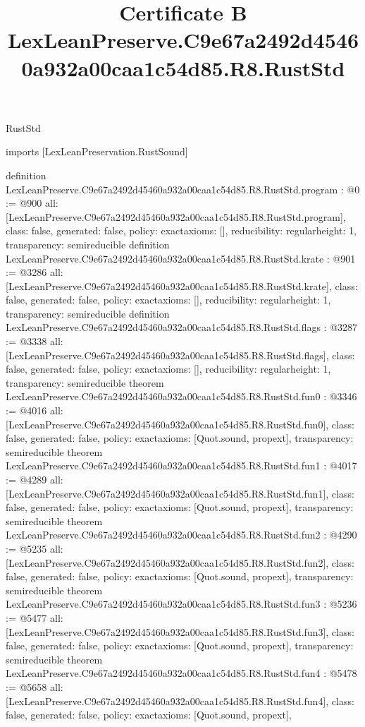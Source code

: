 \begin{lexlean}{RustStd}
\title{Certificate B LexLeanPreserve.C9e67a2492d45460a932a00caa1c54d85.R8.RustStd}
\begin{coremodule}
imports [LexLeanPreservation.RustSound]

definition LexLeanPreserve.C9e67a2492d45460a932a00caa1c54d85.R8.RustStd.program : @0 := @900 {
  all: [LexLeanPreserve.C9e67a2492d45460a932a00caa1c54d85.R8.RustStd.program],
  class: false,
  generated: false,
  policy: exact{axioms: []},
  reducibility: regular{height: 1},
  transparency: semireducible
}
definition LexLeanPreserve.C9e67a2492d45460a932a00caa1c54d85.R8.RustStd.krate : @901 := @3286 {
  all: [LexLeanPreserve.C9e67a2492d45460a932a00caa1c54d85.R8.RustStd.krate],
  class: false,
  generated: false,
  policy: exact{axioms: []},
  reducibility: regular{height: 1},
  transparency: semireducible
}
definition LexLeanPreserve.C9e67a2492d45460a932a00caa1c54d85.R8.RustStd.flags : @3287 := @3338 {
  all: [LexLeanPreserve.C9e67a2492d45460a932a00caa1c54d85.R8.RustStd.flags],
  class: false,
  generated: false,
  policy: exact{axioms: []},
  reducibility: regular{height: 1},
  transparency: semireducible
}
theorem LexLeanPreserve.C9e67a2492d45460a932a00caa1c54d85.R8.RustStd.fun0 : @3346 := @4016 {
  all: [LexLeanPreserve.C9e67a2492d45460a932a00caa1c54d85.R8.RustStd.fun0],
  class: false,
  generated: false,
  policy: exact{axioms: [Quot.sound, propext]},
  transparency: semireducible
}
theorem LexLeanPreserve.C9e67a2492d45460a932a00caa1c54d85.R8.RustStd.fun1 : @4017 := @4289 {
  all: [LexLeanPreserve.C9e67a2492d45460a932a00caa1c54d85.R8.RustStd.fun1],
  class: false,
  generated: false,
  policy: exact{axioms: [Quot.sound, propext]},
  transparency: semireducible
}
theorem LexLeanPreserve.C9e67a2492d45460a932a00caa1c54d85.R8.RustStd.fun2 : @4290 := @5235 {
  all: [LexLeanPreserve.C9e67a2492d45460a932a00caa1c54d85.R8.RustStd.fun2],
  class: false,
  generated: false,
  policy: exact{axioms: [Quot.sound, propext]},
  transparency: semireducible
}
theorem LexLeanPreserve.C9e67a2492d45460a932a00caa1c54d85.R8.RustStd.fun3 : @5236 := @5477 {
  all: [LexLeanPreserve.C9e67a2492d45460a932a00caa1c54d85.R8.RustStd.fun3],
  class: false,
  generated: false,
  policy: exact{axioms: [Quot.sound, propext]},
  transparency: semireducible
}
theorem LexLeanPreserve.C9e67a2492d45460a932a00caa1c54d85.R8.RustStd.fun4 : @5478 := @5658 {
  all: [LexLeanPreserve.C9e67a2492d45460a932a00caa1c54d85.R8.RustStd.fun4],
  class: false,
  generated: false,
  policy: exact{axioms: [Quot.sound, propext]},
}
\end{coremodule}
\end{lexlean}
